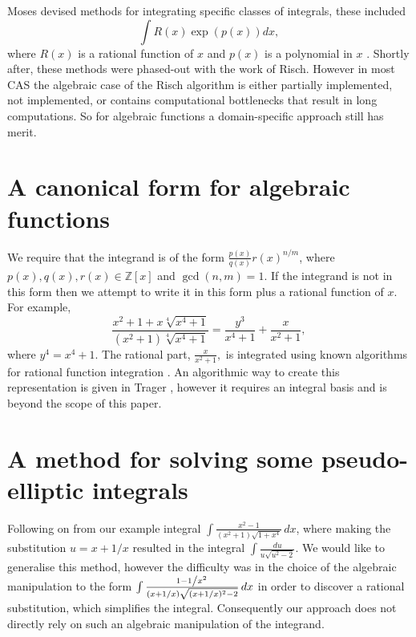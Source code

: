\documentclass[12pt]{article}
\numberwithin{equation}{section}
\theoremstyle{definition}
\begin{document}
Moses devised methods for integrating specific classes of integrals, these 
included $$\int R(x) \exp(p(x)) dx,$$ where $R(x)$ is a rational function of $x$ and $p(x)$ 
is a polynomial in $x$ \cite[pp. 85]{Moses1967}. Shortly after, these methods were 
phased-out with the work of Risch. However in most CAS the algebraic case of the Risch 
algorithm is either partially implemented, not implemented, or contains computational 
bottlenecks that result in long computations. So for algebraic functions a domain-specific 
approach still has merit. 

\section{A canonical form for algebraic functions}
We require that the integrand is of the form $\frac{p(x)}{q(x)}r(x)^{n/m}$, where 
$p(x),q(x),r(x)\in \mathbb{Z}[x]$ and $\gcd (n,m)=1$. If the integrand is not in this form 
then we attempt to write it in this form plus a rational function of $x$. For example, 
$$\frac{x^2+1+x\sqrt[4]{x^4+1}}{\left(x^2+1\right) \sqrt[4]{x^4+1}} = 
\frac{y^3}{x^4+1}+\frac{x}{x^2+1},$$
where $y^4 = x^4+1$. The rational part, $\frac{x}{x^2+1},$ is integrated using known algorithms for rational 
function integration \cite{Bronstein1997}. An algorithmic way to create this representation is given in 
Trager \cite{Trager1984}, however it requires an integral basis and is beyond the scope of this paper. \\

\section{A method for solving some pseudo-elliptic integrals}

Following on from our example integral $\int \frac{x^2-1}{\left(x^2+1\right)\sqrt{1+x^4}} \, dx$, 
where making the substitution $u=x+1/x$ resulted in the integral $\int \frac{du}{u\sqrt{u^2-2}}$. 
We would like to generalise this method, however the difficulty was in the choice of the algebraic 
manipulation to the form 
$\int\frac{1-1\left/x^2\right.}{(x+1/x)\sqrt{(x+1/x)^2-2}} \, dx$ in order to discover a rational 
substitution, which simplifies the integral. Consequently our approach does not directly rely 
on such an algebraic manipulation of the integrand. \\
\end{document}
